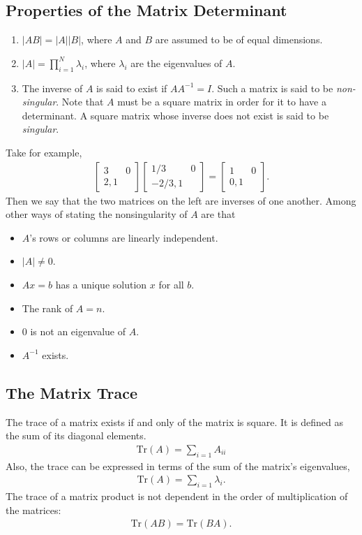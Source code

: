 \subsection{Properties of the Matrix Determinant}
\begin{enumerate}
	\item $|AB| = |A| |B|$, where $A$ and $B$ are assumed to be of equal dimensions.
	\item $|A| = \prod_{i=1}^{N} \lambda_i$, where $\lambda_i$ are the eigenvalues of $A$.
	\item The inverse of $A$ is said to exist if $AA^{-1} = I$. Such a matrix is said to be \textit{non-singular}. Note that $A$ must be a square matrix in order for it to have a determinant. A square matrix whose inverse does not exist is said to be \textit{singular}. 
\end{enumerate}
%
Take for example,
%
\begin{align}
	\begin{bmatrix}
	3 & 0 \\ 2, 1
	\end{bmatrix}
	 \begin{bmatrix}
	1/3 & 0 \\ -2/3, 1
	\end{bmatrix} = 
	 \begin{bmatrix}
	1 & 0 \\ 0, 1
	\end{bmatrix}.
\end{align}
%
Then we say that the two matrices on the left are inverses of one another. Among other ways of stating the nonsingularity of $A$ are that 
%
\begin{itemize}
	\item $A$'s rows or columns are linearly independent.
	\item $|A| \neq 0$.
	\item $Ax = b$ has a unique solution $x$ for all $b$.
	\item The rank of $A=n$.
	\item $0$ is not an eigenvalue of $A$. 
	\item $A^{-1}$ exists.
\end{itemize}

\subsection{The Matrix Trace}
%
The trace of a matrix exists if and only of the matrix is square. It is defined as the sum of its diagonal elements.
%
\begin{align}
	\text{Tr}(A) = \sum_{i=1} A_{ii}
\end{align}
%
Also, the trace can be expressed in terms of the sum of the matrix's eigenvalues,
%
\begin{align}
\text{Tr}(A) = \sum_{i=1} \lambda_i.
\end{align}
%
The trace of a matrix product is not dependent in the order of multiplication of the matrices:
%
\begin{align}
	\text{Tr}(AB) = \text{Tr}(BA).
\end{align}

